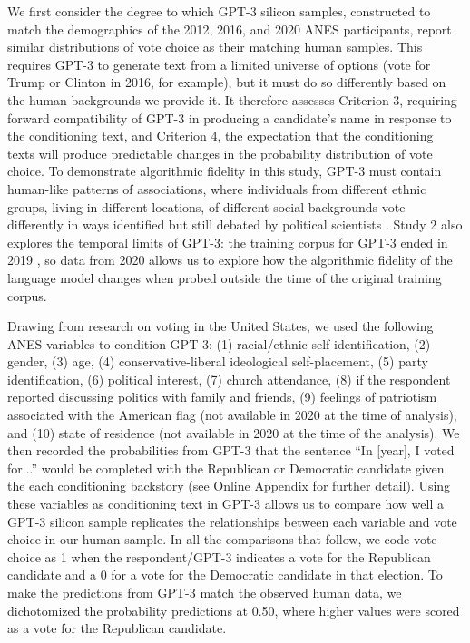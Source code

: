 \documentclass[11pt]{article}
\begin{document}
We first consider the degree to which GPT-3 silicon samples, constructed to match the demographics of the 2012, 2016, and 2020 ANES participants, report similar distributions of vote choice as their matching human samples. This requires GPT-3 to generate text from a limited universe of options (vote for Trump or Clinton in 2016, for example), but it must do so differently based on the human backgrounds we provide it. It therefore assesses Criterion 3, requiring forward compatibility of GPT-3 in producing a candidate's name in response to the conditioning text, and Criterion 4, the expectation that the conditioning texts will produce predictable changes in the probability distribution of vote choice. To demonstrate algorithmic fidelity in this study, GPT-3 must contain human-like patterns of associations, where individuals from different ethnic groups, living in different locations, of different social backgrounds vote differently in ways identified but still debated by political scientists \citep{boxsteffensmeier2004, Tate1994, Cramer2016, Jardina2019}. Study 2 also explores the temporal limits of GPT-3: the training corpus for GPT-3 ended in 2019 \citep{brown2020language}, so data from 2020 allows us to explore how the algorithmic fidelity of the language model changes when probed outside the time of the original training corpus.

Drawing from research on voting in the United States, we used the following ANES variables to condition GPT-3: (1) racial/ethnic self-identification, (2) gender, (3) age, (4) conservative-liberal ideological self-placement, (5) party identification, (6) political interest, (7) church attendance, (8) if the respondent reported discussing politics with family and friends, (9) feelings of patriotism associated with the American flag (not available in 2020 at the time of analysis), and (10) state of residence (not available in 2020 at the time of the analysis). We then recorded the probabilities from GPT-3 that the sentence ``In [year], I voted for...'' would be completed with the Republican or Democratic candidate given the each conditioning backstory (see Online Appendix for further detail). Using these variables as conditioning text in GPT-3 allows us to compare how well a GPT-3 silicon sample replicates the relationships between each variable and vote choice in our human sample. In all the comparisons that follow, we code vote choice as 1 when the respondent/GPT-3 indicates a vote for the Republican candidate and a 0 for a vote for the Democratic candidate in that election. To make the predictions from GPT-3 match the observed human data, we dichotomized the probability predictions at 0.50, where higher values were scored as a vote for the Republican candidate.
\end{document}
